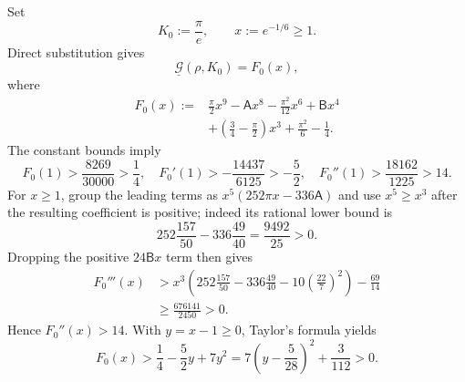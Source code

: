 Set
\begin{equation}
 K_0:=\frac\pi e,
 \qquad x:=e^{-1/6}\geq1.
 \label{rs:eq:base-x}
\end{equation}
Direct substitution gives
\begin{equation}
 \underline{\mathcal G}(\rho,K_0)=F_0(x),
 \label{rs:eq:G-base}
\end{equation}
where
\begin{equation}
 \begin{aligned}
 F_0(x):={}&\frac\pi2x^9-\mathsf A x^8
 -\frac{\pi^2}{12}x^6+\mathsf Bx^4\\
 &+\left(\frac34-\frac\pi2\right)x^3
 +\frac{\pi^2}{6}-\frac14.
 \end{aligned}
 \label{rs:eq:F0}
\end{equation}
The constant bounds imply
\begin{equation}
 F_0(1)>\frac{8269}{30000}>\frac14,
 \quad
 F_0'(1)>-\frac{14437}{6125}>-\frac52,
 \quad
 F_0''(1)>\frac{18162}{1225}>14.
 \label{rs:eq:F0-endpoint}
\end{equation}
For $x\geq1$, group the leading terms as
$x^5(252\pi x-336\mathsf A)$ and use $x^5\geq x^3$ after the
resulting coefficient is positive; indeed its rational lower bound is
\[
 252\frac{157}{50}-336\frac{49}{40}=\frac{9492}{25}>0.
\]
Dropping the positive
$24\mathsf Bx$ term then gives
\begin{equation}
 \begin{aligned}
 F_0'''(x)
 &>x^3\left(
 252\frac{157}{50}-336\frac{49}{40}
 -10\left(\frac{22}{7}\right)^2\right)-\frac{69}{14}\\
 &\geq\frac{676141}{2450}>0.
 \end{aligned}
 \label{rs:eq:F0-third}
\end{equation}
Hence $F_0''(x)>14$.  With $y=x-1\geq0$, Taylor's formula yields
\begin{equation}
 F_0(x)>\frac14-\frac52y+7y^2
 =7\left(y-\frac5{28}\right)^2+\frac3{112}>0.
 \label{rs:eq:F0-positive}
\end{equation}

